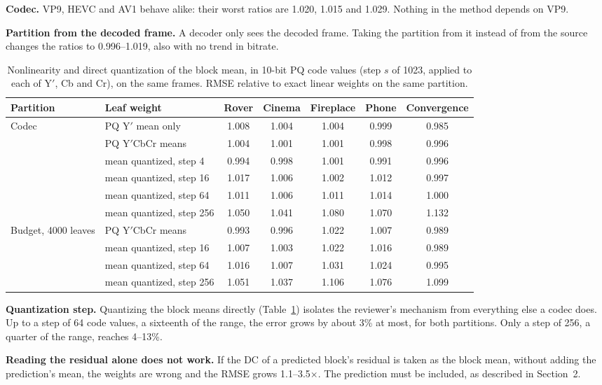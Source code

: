 \documentclass[10pt]{article}
\begin{document}
\textbf{Codec.} VP9, HEVC and AV1 behave alike: their worst ratios are 1.020, 1.015 and 1.029. Nothing in the method depends on VP9.

\textbf{Partition from the decoded frame.} A decoder only sees the decoded frame. Taking the partition from it instead of from the source changes the ratios to 0.996--1.019, also with no trend in bitrate.

\begin{table}[H]
\centering\small
\begin{tabular}{llccccc}
\toprule
Partition & Leaf weight & Rover & Cinema & Fireplace & Phone & Convergence \\
\midrule
Codec & PQ Y$'$ mean only & 1.008 & 1.004 & 1.004 & 0.999 & 0.985 \\
& PQ Y$'$CbCr means & 1.004 & 1.001 & 1.001 & 0.998 & 0.996 \\
& mean quantized, step 4 & 0.994 & 0.998 & 1.001 & 0.991 & 0.996 \\
& mean quantized, step 16 & 1.017 & 1.006 & 1.002 & 1.012 & 0.997 \\
& mean quantized, step 64 & 1.011 & 1.006 & 1.011 & 1.014 & 1.000 \\
& mean quantized, step 256 & 1.050 & 1.041 & 1.080 & 1.070 & 1.132 \\
\midrule
Budget, 4000 leaves & PQ Y$'$CbCr means & 0.993 & 0.996 & 1.022 & 1.007 & 0.989 \\
& mean quantized, step 16 & 1.007 & 1.003 & 1.022 & 1.016 & 0.989 \\
& mean quantized, step 64 & 1.016 & 1.007 & 1.031 & 1.024 & 0.995 \\
& mean quantized, step 256 & 1.051 & 1.037 & 1.106 & 1.076 & 1.099 \\
\bottomrule
\end{tabular}
\caption{Nonlinearity and direct quantization of the block mean, in 10-bit PQ code values (step $s$ of 1023, applied to each of Y$'$, Cb and Cr), on the same frames. RMSE relative to exact linear weights on the same partition.}
\label{tab:emul}
\end{table}

\textbf{Quantization step.} Quantizing the block means directly (Table~\ref{tab:emul}) isolates the reviewer's mechanism from everything else a codec does. Up to a step of 64 code values, a sixteenth of the range, the error grows by about 3\% at most, for both partitions. Only a step of 256, a quarter of the range, reaches 4--13\%.

\textbf{Reading the residual alone does not work.} If the DC of a predicted block's residual is taken as the block mean, without adding the prediction's mean, the weights are wrong and the RMSE grows 1.1--3.5$\times$. The prediction must be included, as described in Section~2.
\end{document}

